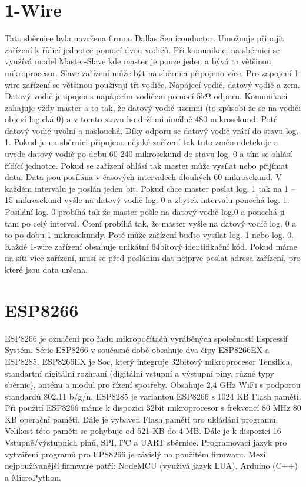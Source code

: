 \documentclass[a4paper,12pt,czech,bibliography=totoc]{scrbook}
\begin{document}
\section{1-Wire}
Tato sběrnice byla navržena firmou Dallas Semiconductor. Umožnuje připojit zařízení k řídící jednotce pomocí dvou vodičů. Při komunikaci na sběrnici se využívá model Master-Slave kde master je pouze jeden a bývá to většinou mikroprocesor. Slave zařízení může být na sběrnici připojeno více. Pro zapojení 1-wire zařízení se většinou používají tři vodiče. Napájecí vodič, datový vodič a zem. Datový vodič je spojen s napájecím vodičem pomocí 5kΩ odporu. 
\newline
Komunikaci zahajuje vždy master a to tak, že datový vodič uzemní (to způsobí že se na vodiči objeví logická 0) a v tomto stavu ho drží minimálně 480 mikrosekund. Poté datový vodič uvolní a naslouchá. Díky odporu se datový vodič vrátí do stavu log. 1. Pokud je na sběrnici připojeno nějaké zařízení tak tuto změnu detekuje a uvede datový vodič po dobu 60-240 mikrosekund do stavu log. 0 a tím se ohlásí řídící jednotce. Pokud se zařízení ohlásí tak master může vysílat nebo přijímat data.
\newline
Data jsou posílána v časových intervalech dlouhých 60 mikrosekund. V každém intervalu je poslán jeden bit. Pokud chce master poslat log. 1 tak na 1 – 15 mikrosekund vyšle na datový vodič log. 0 a zbytek intervalu ponechá log. 1.  Posílání log. 0 probíhá tak že master pošle na datový vodič log.0 a ponechá ji tam po celý interval.
\newline
Čtení probíhá tak, že master vyšle na datový vodič log. 0 a to po dobu 1 mikrosekundy. Poté může zařízení buďto vysílat log. 1 nebo log. 0.
\newline
Každé 1-wire zařízení obsahuje unikátní 64bitový identifikační kód. Pokud máme na síti více zařízení, musí se před posláním dat nejprve poslat adresa zařízení, pro které jsou data určena. 
\section{ESP8266}
ESP8266 je označení pro řadu mikropočítačů vyráběných společností Espressif Systém. Série ESP8266 v současné době obsahuje dva čipy ESP8266EX a ESP8285.
\newline
ESP8266EX je Soc, který integruje 32bitový mikroprocesor Tensilica, standartní digitální rozhraní (digitální vstupní a výstupní piny, různé typy sběrnic), anténu a modul pro řízení spotřeby. Obsahuje 2,4 GHz WiFi s podporou standardů 802.11 b/g/n.
 \newline
ESP8285 je variantou ESP8266 s 1024 KB Flash pamětí.
 \newline
Při použití ESP8266 máme k dispozici 32bit mikroprocesor s frekvencí 80 MHz 80 KB operační paměti. Dále je vybaven Flash pamětí pro ukládání programu. Velikost této paměti se pohybuje od 521 KB do 4 MB. Dále je k dispozici 16 Vstupně/výstupních pinů, SPI, I²C a UART sběrnice. 
\newline
Programovací jazyk pro vytváření programů pro EPS8266 je závislý na použitém firmwaru. Mezi nejpoužívanější firmware patří: NodeMCU (využívá jazyk LUA), Arduino (C++) a MicroPython.
\cite{Schwartz2016}
\end{document}
